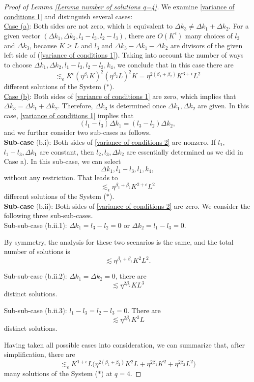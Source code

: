 \documentclass[11pt]{amsart}
\numberwithin{equation}{section}
\theoremstyle{definition}
\theoremstyle{proposition}
\begin{document}
\begin{proof} [Proof of Lemma \ref{Lemma number of solutions q=4}]
We examine \eqref{variance of conditions 1} and distinguish several cases: \\

\underline{Case (a)}: Both sides are not zero, which is equivalent to $\Delta k_3 \neq \Delta k_1+\Delta k_2$. For a given vector $(\Delta k_1, \Delta k_2, l_1-l_3,l_2-l_3)$, there are $O(K^\epsilon)$ many choices of  $l_3$ and $\Delta k_3$, because $K\ge L$ and 
$l_3$ and $\Delta k_3-\Delta k_1-\Delta k_2$ are divisors of the given left side of (\ref{variance of conditions 1}).
Taking into account the number of ways to choose $\Delta k_1, \Delta k_2, l_1-l_3,l_2-l_3, k_4$, we conclude that in this case there are
\[
\lesssim_\epsilon K^\epsilon (\eta^{\beta_1}K)^2 (\eta^{\beta_2}L)^2 K=\eta^{2(\beta_1+\beta_2)}K^{3+\epsilon}L^2
\]
different solutions of the System ($*$). \\


\underline{Case (b)}: Both sides of \eqref{variance of conditions 1} are zero, which implies that $\Delta k_3=\Delta k_1+\Delta k_2$. Therefore, $\Delta k_3$ is determined once $\Delta k_1, \Delta k_2$ are given. In this case, \eqref{variance of conditions 1} implies that 
\begin{equation}  \label{variance of conditions 2}
(l_1-l_3)\Delta k_1=(l_3-l_2)\Delta k_2,   
\end{equation}
and we further consider two sub-cases as follows. \\

{\bf Sub-case} (b.i): Both sides of \eqref{variance of conditions 2} are nonzero. If $l_1$, $l_1-l_3,\Delta k_1$ are constant, then  $l_2,l_3,\Delta k_2$ are essentially determined as we did in Case a).  In this sub-case, we can select
\[
\Delta k_1,l_1-l_3, l_1, k_4, 
\]
without any restriction. That leads to
\[
\lesssim_\epsilon \eta^{\beta_1+\beta_2} K^{2+\epsilon}L^2
\]
different solutions of the System ($*$). \\

{\bf Sub-case} (b.ii): Both sides of \eqref{variance of conditions 2} are zero. We consider the following three sub-sub-cases.\\

Sub-sub-case (b.ii.1): $\Delta k_1=l_3-l_2=0$ or $\Delta k_2=l_1-l_3=0$.

By symmetry, the analysis for these two scenarios is the same, and the total number of solutions is 
\[
\lesssim \eta^{\beta_1+\beta_2} K^2 L^2.
\]

Sub-sub-case (b.ii.2): $\Delta k_1=\Delta k_2=0$, there are 
\[
\lesssim \eta^{2\beta_2}KL^3
\]
distinct solutions.

Sub-sub-case (b.ii.3): $l_1-l_3=l_2-l_3=0$. There are 
\[
\lesssim \eta^{2\beta_1}K^3 L
\]
distinct solutions. 

Having taken all possible cases into consideration, we can summarize that, after simplification, there are 
\[
\lesssim_\epsilon K^{1+\epsilon}L \Big( \eta^{2(\beta_1+\beta_2)}K^2 L+\eta^{2\beta_1}K^2+\eta^{2\beta_2}L^2 \Big)  
\]
many solutions of the System ($*$) at $q=4$.
\end{proof}
\end{document}
